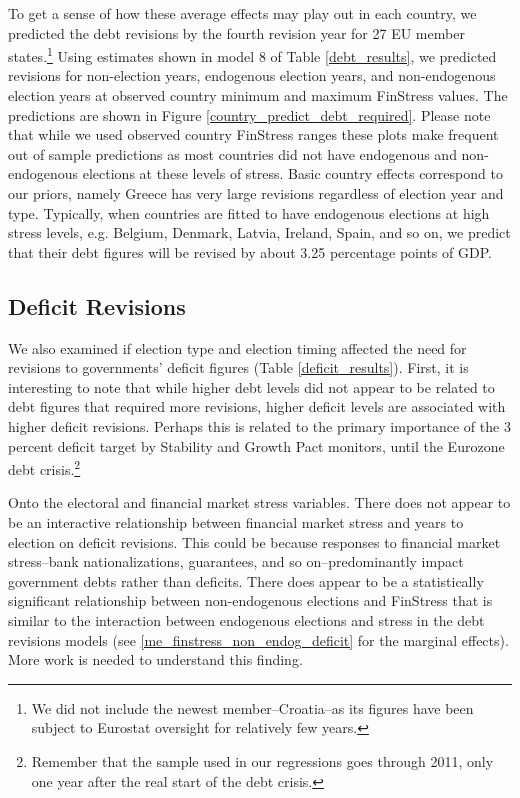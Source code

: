 \documentclass[]{article}
\begin{document}
To get a sense of how these average effects may play out in each country, we predicted the debt revisions by the fourth revision year for 27 EU member states.\footnote{We did not include the newest member--Croatia--as its figures have been subject to Eurostat oversight for relatively few years.} Using estimates shown in model 8 of Table \ref{debt_results}, we predicted revisions for non-election years, endogenous election years, and non-endogenous election years at observed country minimum and maximum FinStress values. The predictions are shown in Figure \ref{country_predict_debt_required}. Please note that while we used observed country FinStress ranges these plots make frequent out of sample predictions as most countries did not have endogenous and non-endogenous elections at these levels of stress. Basic country effects correspond to our priors, namely Greece has very large revisions regardless of election year and type. Typically, when countries are fitted to have endogenous elections at high stress levels, e.g. Belgium, Denmark, Latvia, Ireland, Spain, and so on, we predict that their debt figures will be revised by about 3.25 percentage points of GDP.



\subsection{Deficit Revisions}

We also examined if election type and election timing affected the need for revisions to governments' deficit figures (Table \ref{deficit_results}). First, it is interesting to note that while higher debt levels did not appear to be related to debt figures that required more revisions, higher deficit levels are associated with higher deficit revisions. Perhaps this is related to the primary importance of the 3 percent deficit target by Stability and Growth Pact monitors, until the Eurozone debt crisis.\footnote{Remember that the sample used in our regressions goes through 2011, only one year after the real start of the debt crisis.}

Onto the electoral and financial market stress variables. There does not appear to be an interactive relationship between financial market stress and years to election on deficit revisions. This could be because responses to financial market stress--bank nationalizations, guarantees, and so on--predominantly impact government debts rather than deficits. There does appear to be a statistically significant relationship between non-endogenous elections and FinStress that is similar to the interaction between endogenous elections and stress in the debt revisions models (see \ref{me_finstress_non_endog_deficit} for the marginal effects). More work is needed to understand this finding.
\end{document}

